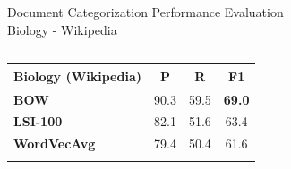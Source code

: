 \documentclass[10pt]{beamer}
\newcommand{\highest}[1]{\textbf{#1}}
\begin{document}
\begin{frame}{Document Categorization Performance Evaluation \\ Biology - Wikipedia }
\begin{columns}[T]
	\hspace{5mm}
	\begin{column}{.4\textwidth}
		\begin{table}[h!]
		\tabcolsep=0.1cm
		\scriptsize
		\begin{center}
		\begin{tabular}{l@{\hskip5mm} c c@{\hskip4mm} c}
		\toprule
		\textbf{Biology (Wikipedia)} & {P} & {R} & \textbf{F1} \\
		\midrule
		\textbf{BOW}
		& 90.3   & 59.5  & \highest{69.0} \\
		\textbf{LSI-100}
		& 82.1   & 51.6  & 63.4 \\
		\textbf{WordVecAvg}
		& 79.4   & 50.4  & 61.6 \\ \addlinespace[1mm]


\end{tabular}
\end{center}
\end{table}
\end{column}
\end{columns}
\end{frame}
\end{document}

